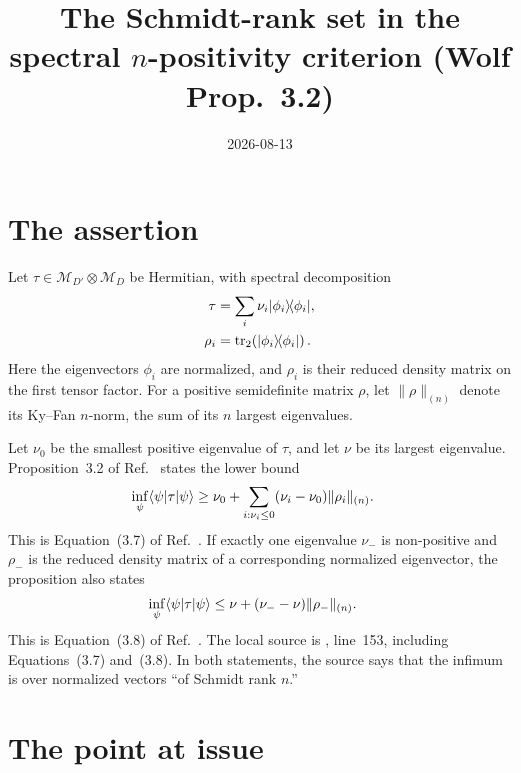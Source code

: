 \documentclass[11pt]{article}
\title{The Schmidt-rank set in the spectral $n$-positivity criterion
  (Wolf Prop.~3.2)}
\author{}
\date{2026-08-13}
\begin{document}
\maketitle
{}

\section{The assertion}

Let $\tau\in\mathcal M_{D'}\otimes\mathcal M_D$ be Hermitian, with spectral
decomposition
\begin{align}
    \tau&=\sum_i\nu_i|\phi_i\rangle\!\langle \phi_i|,
    \label{eq:wolf_prop_3_2_schmidt_rank_reading_spectral_decomposition}\\
    \rho_i&=\operatorname{tr}_2\!\left(|\phi_i\rangle\!\langle \phi_i|\right).
    \label{eq:wolf_prop_3_2_schmidt_rank_reading_reduced_density}
\end{align}
Here the eigenvectors $\phi_i$ are normalized, and $\rho_i$ is their reduced
density matrix on the first tensor factor. For a positive semidefinite matrix
$\rho$, let $\lVert\rho\rVert_{(n)}$ denote its Ky--Fan $n$-norm, the sum of
its $n$ largest eigenvalues.

Let $\nu_0$ be the smallest positive eigenvalue of $\tau$, and let $\nu$ be
its largest eigenvalue. Proposition~3.2 of Ref.~\cite{Wolf2012Quantum} states
the lower bound
\begin{align}
    \inf_{\psi}\langle \psi|\tau|\psi\rangle
        &\geq \nu_0+
        \sum_{i:\nu_i\leq0}(\nu_i-\nu_0)\lVert\rho_i\rVert_{(n)}.
    \label{eq:wolf_prop_3_2_schmidt_rank_reading_source_lower_bound}
\end{align}
This is Equation~(3.7) of Ref.~\cite{Wolf2012Quantum}. If exactly one
eigenvalue $\nu_-$ is non-positive and $\rho_-$ is the reduced density matrix
of a corresponding normalized eigenvector, the proposition also states
\begin{align}
    \inf_{\psi}\langle \psi|\tau|\psi\rangle
        &\leq \nu+(\nu_--\nu)\lVert\rho_-\rVert_{(n)}.
    \label{eq:wolf_prop_3_2_schmidt_rank_reading_source_upper_bound}
\end{align}
This is Equation~(3.8) of Ref.~\cite{Wolf2012Quantum}. The local source is
, line~153,
including Equations~(3.7) and~(3.8). In both statements, the source says that
the infimum is over normalized vectors ``of Schmidt rank $n$.''

\section{The point at issue}
\end{document}
